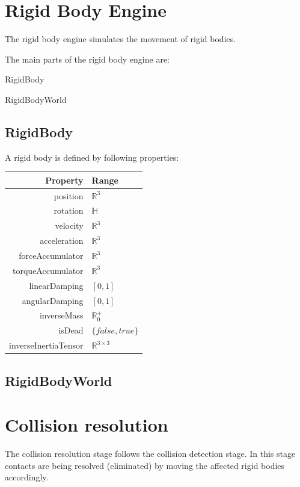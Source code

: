 \documentclass[12p, paper=a4, leqno, colorinlistoftodos]{article}
\newenvironment{packed_itemize}
{\begin{itemize}
		\setlength{\itemsep}{0pt}
		\setlength{\parskip}{0pt}
		\setlength{\parsep}{0pt}
	}{\end{itemize}}
\begin{document}
		
		
	
	\pagebreak
	\section{Rigid Body Engine}
		The rigid body engine simulates the movement of rigid bodies.
		
		The main parts of the rigid body engine are:
		\begin{packed_itemize}
			\item RigidBody
			\item RigidBodyWorld
		\end{packed_itemize}
	
		\subsection{RigidBody}
		A rigid body is defined by following properties:
		
		\begin{tabular}[H]{r | l}
			Property & Range\\
			\hline
			position & $\mathbb{R}^3$\\
			rotation & $\mathbb{H}$\\
			velocity & $\mathbb{R}^3$\\
			acceleration & $\mathbb{R}^3$\\
			forceAccumulator & $\mathbb{R}^3$\\
			torqueAccumulator & $\mathbb{R}^3$\\
			linearDamping & $[0, 1]$\\
			angularDamping & $[0, 1]$\\
			inverseMass & $\mathbb{R}^+_0$\\
			isDead & $\{false, true\}$\\
			inverseInertiaTensor & $\mathbb{R}^{3 \times 3}$\\
		\end{tabular}
	
		\subsection{RigidBodyWorld}
	
	\pagebreak
	\section{Collision resolution}
	The collision resolution stage follows the collision detection stage. In this stage contacts are being resolved (eliminated) by moving the affected rigid bodies accordingly. 
		
\end{document}
